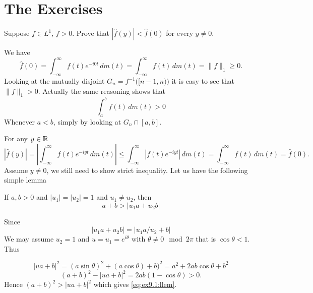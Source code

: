 \section{The Exercises} %


\begin{enumerate}


\begin{excopy}
Suppose \(f \in L^1\), \(f>0\).
Prove that \(|\hat{f}(y)| < \hat{f}(0)\) for every \(y\neq 0\).
\end{excopy}

We have
\begin{equation*}
\hat{f}(0)
= \int_{-\infty}^\infty f(t)e^{-i0t}\,dm(t)
= \int_{-\infty}^\infty f(t)\,dm(t)
= \|f\|_1 \geq 0.
\end{equation*}
Looking at the mutually disjoint \(G_n = f^{-1}\bigl([n-1,n)\bigr)\)
it is easy to see that \(\|f\|_1 > 0\). Actually the same reasoning
shows that
\begin{equation*}
\int_a^b f(t)\,dm(t) > 0
\end{equation*}
Whenever \(a<b\), simply by looking at \(G_n \cap [a,b]\).


For any \(y\in\mathbb{R}\)
\begin{equation*}
|\hat{f}(y)|
= \left| \int_{-\infty}^\infty f(t)e^{-iyt}\,dm(t) \right|
\leq  \int_{-\infty}^\infty |f(t)e^{-iyt}|\,dm(t)
= \int_{-\infty}^\infty f(t)\,dm(t)
= \hat{f}(0).
\end{equation*}
Assume \(y\neq 0\),
we still need to show strict inequality.
Let us have the following simple lemma
\begin{llem} \label{lem:aubuLYab}
If \(a,b>0\) and \(|u_1|=|u_2|=1\) and \(u_1 \neq u_2\),
then
\begin{equation} \label{eq:ex9.1:llem}
a + b > |u_1a + u_2 b|
\end{equation}
\end{llem}
\begin{thmproof}
Since
\begin{equation*}
|u_1a + u_2 b| = |u_1a/u_2 + b|
\end{equation*}
We may assume \(u_2=1\) and \(u = u_1 = e^{i\theta}\)
with \(\theta \neq 0 \mod 2\pi\) that is \(\cos\theta < 1\).
Thus

\begin{equation*}
|ua + b|^2
= (a\sin\theta)^2 + (a\cos\theta) + b)^2
= a^2 + 2ab\cos\theta + b^2
\end{equation*}
\begin{equation*}
(a+b)^2 - |ua + b|^2 = 2ab(1-\cos\theta) > 0.
\end{equation*}
Hence \((a+b)^2 > |ua + b|^2\) which gives \eqref{eq:ex9.1:llem}.
\end{thmproof}


\end{enumerate}
